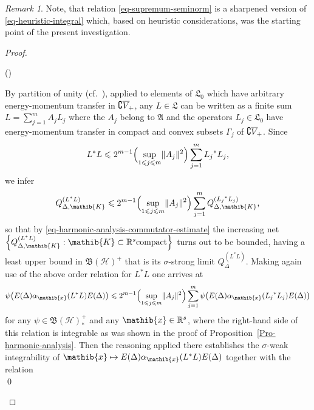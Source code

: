 \documentclass[11pt,twoside,openright]{report}
\theoremstyle{definition}
\theoremstyle{plain}
\theoremstyle{remark}
\newtheorem*{Rem}{Remark}
\theoremstyle{assumption}
\newcommand{\Bset}[1]{\Bigl\{ #1 \Bigr\}}
\newcommand{\norm}[1]{\lVert #1 \rVert}
\newcommand{\Afrak}{\mathfrak{A}}
\newcommand{\Lfrak}{\mathfrak{L}}
\newcommand{\Kib}{\mathib{K}}
\newcommand{\xib}{\mathib{x}}
\newcommand{\Rs}{\mathbb{R}^s}
\newcommand{\BH}{\mathfrak{B} ( \mathscr{H} )}
\newcommand{\fwcone}{\overline{V}_{\negthinspace +}}
\newcommand{\ED}{E ( \Delta )}
\newcommand{\aibx}{\alpha_\mathib{x}}
\newcounter{proofitem}
\newenvironment{prooflist}{\begin{list}{(\roman{proofitem})}%
  {\usecounter{proofitem} \setlength{\topsep}{0ex}%
   \setlength{\parsep}{0.2ex} \setlength{\itemsep}{0.4ex}%
   \setlength{\leftmargin}{0em} \setlength{\itemindent}{0.5em}%
   \setlength{\listparindent}{1em}}}{\qed \end{list}}
\begin{document}
\begin{Rem}
  Note, that relation \eqref{eq-supremum-seminorm} is a sharpened
  version of \eqref{eq-heuristic-integral} which, based on heuristic
  considerations, was the starting point of the present
  investigation. 
\end{Rem}
\begin{proof}
  \begin{prooflist}
  \item By partition of unity (cf.~\cite[Satz~8.1]{jantscher:1971}),
    applied to elements of $\Lfrak_0$ which have arbitrary
    energy-momentum transfer in $\complement \fwcone$, any $L \in
    \Lfrak$ can be written as a finite sum $L = \sum_{j = 1}^m A_j
    L_j$ where the $A_j$ belong to $\Afrak$ and the operators $L_j \in
    \Lfrak_0$ have energy-momentum transfer in compact and convex
    subsets $\Gamma_j$ of $\complement \fwcone$. Since
    \begin{equation*}
      L^* L \leqslant 2^{m - 1} \Bigl( \sup_{1 \leqslant j \leqslant
      m} \norm{A_j}^2 \Bigr) \sum_{j = 1}^m {L_j}^* L_j \text{,} 
    \end{equation*}
    we infer
    \begin{equation*}
      Q_{\Delta , \Kib}^{( L^* L )} \leqslant 2^{m - 1} \Bigl( \sup_{1
      \leqslant j \leqslant m} \norm{A_j}^2 \Bigr) \sum_{j = 1}^m
      Q_{\Delta , \Kib}^{( {L_j}^* L_j )} \text{,} 
    \end{equation*}
    so that by \eqref{eq-harmonic-analysis-commutator-estimate}
    the increasing net $\Bset{Q_{\Delta , \Kib}^{( L^* L )} : \Kib
    \subset \Rs \mathrm{compact}}$ turns out to be bounded, having a
    least upper bound in $\BH^+$ that is its $\sigma$-strong limit
    $Q_\Delta^{( L^* L )}$. Making again use of the above order
    relation for $L^* L$ one arrives at
    \begin{equation*}
      \psi \bigl( \ED \aibx ( L^* L ) \ED \bigr) \leqslant 2^{m - 1}
      \Bigl( \sup_{1 \leqslant j \leqslant m} \norm{A_j}^2 \Bigr)
      \sum_{j = 1}^m \psi \bigl( \ED \aibx ( {L_j}^* L_j ) \ED \bigr) 
    \end{equation*}
    for any $\psi \in \BH^+_*$ and any $\xib \in \Rs$, where the
    right-hand side of this relation is integrable as was shown in the
    proof of Proposition~\ref{Pro-harmonic-analysis}. Then the
    reasoning applied there establishes the $\sigma$-weak
    integrability of $\xib \mapsto \ED \aibx ( L^* L ) \ED$ together
    with the relation 
    \begin{equation*}

\end{equation*}
\end{prooflist}
\end{proof}
\end{document}
